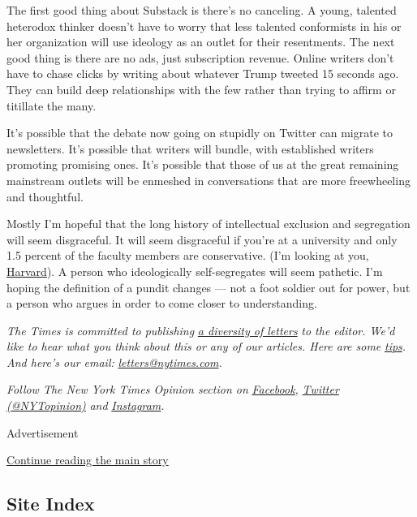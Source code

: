 The first good thing about Substack is there's no canceling. A young,
talented heterodox thinker doesn't have to worry that less talented
conformists in his or her organization will use ideology as an outlet
for their resentments. The next good thing is there are no ads, just
subscription revenue. Online writers don't have to chase clicks by
writing about whatever Trump tweeted 15 seconds ago. They can build deep
relationships with the few rather than trying to affirm or titillate the
many.

It's possible that the debate now going on stupidly on Twitter can
migrate to newsletters. It's possible that writers will bundle, with
established writers promoting promising ones. It's possible that those
of us at the great remaining mainstream outlets will be enmeshed in
conversations that are more freewheeling and thoughtful.

Mostly I'm hopeful that the long history of intellectual exclusion and
segregation will seem disgraceful. It will seem disgraceful if you're at
a university and only 1.5 percent of the faculty members are
conservative. (I'm looking at you,
\href{https://www.thecrimson.com/article/2020/3/3/faculty-support-warren-president/}{Harvard}).
A person who ideologically self-segregates will seem pathetic. I'm
hoping the definition of a pundit changes --- not a foot soldier out for
power, but a person who argues in order to come closer to understanding.

\emph{The Times is committed to publishing}
\href{https://www.nytimes.com/2019/01/31/opinion/letters/letters-to-editor-new-york-times-women.html}{\emph{a
diversity of letters}} \emph{to the editor. We'd like to hear what you
think about this or any of our articles. Here are some}
\href{https://help.nytimes.com/hc/en-us/articles/115014925288-How-to-submit-a-letter-to-the-editor}{\emph{tips}}\emph{.
And here's our email:}
\href{mailto:letters@nytimes.com}{\emph{letters@nytimes.com}}\emph{.}

\emph{Follow The New York Times Opinion section on}
\href{https://www.facebook.com/nytopinion}{\emph{Facebook}}\emph{,}
\href{http://twitter.com/NYTOpinion}{\emph{Twitter (@NYTopinion)}}
\emph{and}
\href{https://www.instagram.com/nytopinion/}{\emph{Instagram}}\emph{.}

Advertisement

\protect\hyperlink{after-bottom}{Continue reading the main story}

\hypertarget{site-index}{%
\subsection{Site Index}\label{site-index}}


